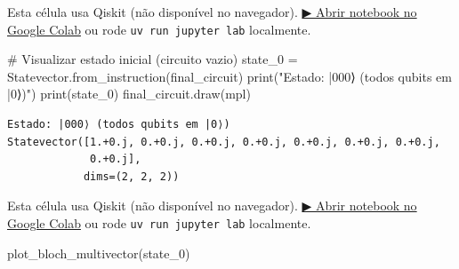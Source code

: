 \documentclass[
  brazilian,
]{report}
\newenvironment{Shaded}{\begin{snugshade}}{\end{snugshade}}
\newcommand{\BuiltInTok}[1]{\textcolor[rgb]{0.00,0.23,0.31}{#1}}
\newcommand{\CommentTok}[1]{\textcolor[rgb]{0.37,0.37,0.37}{#1}}
\newcommand{\NormalTok}[1]{\textcolor[rgb]{0.00,0.23,0.31}{#1}}
\newcommand{\OperatorTok}[1]{\textcolor[rgb]{0.37,0.37,0.37}{#1}}
\newcommand{\StringTok}[1]{\textcolor[rgb]{0.13,0.47,0.30}{#1}}
\begin{document}
\begin{tcolorbox}[enhanced jigsaw, arc=.35mm, bottomrule=.15mm, bottomtitle=1mm, breakable, colback=white, colbacktitle=quarto-callout-warning-color!10!white, colframe=quarto-callout-warning-color-frame, coltitle=black, left=2mm, leftrule=.75mm, opacityback=0, opacitybacktitle=0.6, rightrule=.15mm, title=\textcolor{quarto-callout-warning-color}{\faExclamationTriangle}\hspace{0.5em}{⚛️ Célula Qiskit --- execute no Colab ou localmente}, titlerule=0mm, toprule=.15mm, toptitle=1mm]

Esta célula usa Qiskit (não disponível no navegador).
\href{https://colab.research.google.com/github/maxwellamaral/aula-quantum/blob/main/notebooks/02-teletransport.ipynb}{▶
Abrir notebook no Google Colab} ou rode \texttt{uv\ run\ jupyter\ lab}
localmente.

\begin{Shaded}
\begin{Highlighting}[]

\CommentTok{\# Visualizar estado inicial (circuito vazio)}
\NormalTok{state\_0 }\OperatorTok{=}\NormalTok{ Statevector.from\_instruction(final\_circuit)}
\BuiltInTok{print}\NormalTok{(}\StringTok{"Estado: |000⟩ (todos qubits em |0⟩)"}\NormalTok{)}
\BuiltInTok{print}\NormalTok{(state\_0)}
\NormalTok{final\_circuit.draw(}\StringTok{\textquotesingle{}mpl\textquotesingle{}}\NormalTok{)}
\end{Highlighting}
\end{Shaded}

\end{tcolorbox}

\begin{verbatim}
Estado: |000⟩ (todos qubits em |0⟩)
Statevector([1.+0.j, 0.+0.j, 0.+0.j, 0.+0.j, 0.+0.j, 0.+0.j, 0.+0.j,
             0.+0.j],
            dims=(2, 2, 2))
\end{verbatim}

\begin{tcolorbox}[enhanced jigsaw, arc=.35mm, bottomrule=.15mm, bottomtitle=1mm, breakable, colback=white, colbacktitle=quarto-callout-warning-color!10!white, colframe=quarto-callout-warning-color-frame, coltitle=black, left=2mm, leftrule=.75mm, opacityback=0, opacitybacktitle=0.6, rightrule=.15mm, title=\textcolor{quarto-callout-warning-color}{\faExclamationTriangle}\hspace{0.5em}{⚛️ Célula Qiskit --- execute no Colab ou localmente}, titlerule=0mm, toprule=.15mm, toptitle=1mm]

Esta célula usa Qiskit (não disponível no navegador).
\href{https://colab.research.google.com/github/maxwellamaral/aula-quantum/blob/main/notebooks/02-teletransport.ipynb}{▶
Abrir notebook no Google Colab} ou rode \texttt{uv\ run\ jupyter\ lab}
localmente.

\begin{Shaded}
\begin{Highlighting}[]

\NormalTok{plot\_bloch\_multivector(state\_0)}
\end{Highlighting}
\end{Shaded}

\end{tcolorbox}
\end{document}
